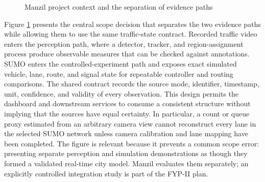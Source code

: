 \begin{figure}[htbp]
\centering
{}
\caption{Manzil project context and the separation of evidence paths}
\label{fig:context}
\end{figure}

Figure \ref{fig:context} presents the central scope decision that separates the two evidence paths while allowing them to use the same traffic-state contract. Recorded traffic video enters the perception path, where a detector, tracker, and region-assignment process produce observable measures that can be checked against annotations. SUMO enters the controlled-experiment path and exposes exact simulated vehicle, lane, route, and signal state for repeatable controller and routing comparisons. The shared contract records the source mode, identifier, timestamp, unit, confidence, and validity of every observation. This design permits the dashboard and downstream services to consume a consistent structure without implying that the sources have equal certainty. In particular, a count or queue proxy estimated from an arbitrary camera view cannot reconstruct every lane in the selected SUMO network unless camera calibration and lane mapping have been completed. The figure is relevant because it prevents a common scope error: presenting separate perception and simulation demonstrations as though they formed a validated real-time city model. Manzil evaluates them separately; an explicitly controlled integration study is part of the FYP-II plan.


